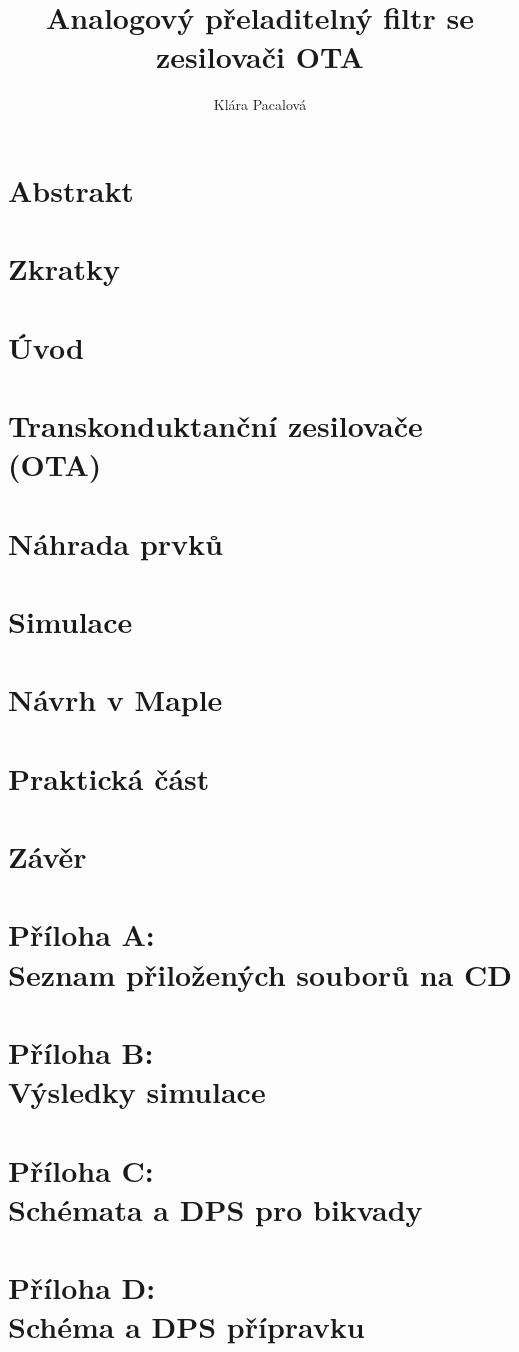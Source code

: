 \documentclass[twoside]{article}
\newcommand{\sekce}[1]{\clearpage \section{#1}}
\newcommand{\nadpis}[1]{\newpage \section*{#1}}
\begin{document}
\title{Analogový přeladitelný filtr se zesilovači OTA}
\author{Klára Pacalová}


\fancyhf[HC]{\bfseries\leftmark}


\thispagestyle{empty} 
\nadpis{}

\thispagestyle{empty} 
\nadpis{}

\thispagestyle{empty} 
\nadpis{Abstrakt}

\renewcommand{\headrulewidth}{0.5pt}

\nadpis{Zkratky}


{
\hypersetup{hidelinks}
\newpage
\tableofcontents
\newpage
\listoffigures
\newpage
\listoftables
}

\clearpage
\setcounter{page}{1}
\sekce{Úvod}

\sekce{Transkonduktanční zesilovače (OTA)}
\label{s:OTA}
\sekce{Náhrada prvků}\label{s:NAH}

\sekce{Simulace}

\sekce{Návrh v Maple}\label{s:MAPLE}

\sekce{Praktická část}\label{s:PRAK}

\sekce{Závěr}

\newpage

\renewcommand{\headrulewidth}{0pt}
\fancyhf{}
\newpage
\section*{Příloha A: \\Seznam přiložených souborů na CD}

\clearpage
\section*{Příloha B: \\Výsledky simulace} 

\clearpage
\section*{Příloha C: \\Schémata a DPS pro bikvady} 

\clearpage
\section*{Příloha D: \\Schéma a DPS přípravku} 

\end{document}
